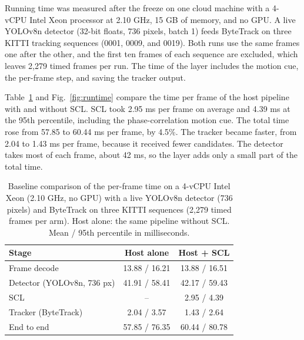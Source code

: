 \documentclass[pdflatex,sn-mathphys-num,iicol]{sn-jnl}
\makeatletter
\def\subsectionfont{\reset@font\fontfamily{\rmdefault}\fontsize{10bp}{12bp}\bfseries\selectfont\raggedright\boldmath}
\renewcommand\subsection{\@startsection{subsection}{2}{\z@}{-7pt \@plus -2pt \@minus -2pt}{3pt}{\subsectionfont}}
\newcommand{\scl}{SCL}
\makeatother
\begin{document}
\subsection{Running time}\label{sec:latency}
\label{sec:latency-setup}Running time was measured after the freeze on one cloud machine with a 4-vCPU
Intel Xeon processor at 2.10 GHz, 15 GB of memory, and no GPU. A live YOLOv8n
detector (32-bit floats, 736 pixels, batch 1) feeds ByteTrack on three KITTI
tracking sequences (0001, 0009, and 0019). Both runs use the same frames
one after the other, and the first ten frames of each sequence are excluded,
which leaves 2,279 timed frames per run. The time of the layer includes the
motion cue, the per-frame step, and saving the tracker output.

Table~\ref{tab:runtime} and Fig.~\ref{fig:runtime} compare the time per frame
of the host pipeline with and without \scl{}. \scl{} took 2.95 ms per
frame on average and 4.39 ms at the 95th percentile, including the
phase-correlation motion cue. The total time rose from 57.85 to 60.44 ms
per frame, by 4.5\%. The tracker became faster, from 2.04 to 1.43 ms per
frame, because it received fewer candidates. The detector takes most of each
frame, about 42 ms, so the layer adds only a small part of the total time.

\begin{table}[t]
\caption{Baseline comparison of the per-frame time on a 4-vCPU Intel Xeon
(2.10 GHz, no GPU) with a live YOLOv8n detector (736 pixels) and ByteTrack on
three KITTI sequences (2,279 timed frames per arm). Host alone: the same
pipeline without \scl{}. Mean / 95th percentile in milliseconds.}
\label{tab:runtime}
\centering\footnotesize
\setlength{\tabcolsep}{4pt}
\begin{tabular}{@{}lcc@{}}
\toprule
Stage & Host alone & Host + \scl{}\\
\midrule
Frame decode & 13.88 / 16.21 & 13.88 / 16.51\\
Detector (YOLOv8n, 736 px) & 41.91 / 58.41 & 42.17 / 59.43\\
\scl{} & -- & 2.95 / 4.39\\
Tracker (ByteTrack) & 2.04 / 3.57 & 1.43 / 2.64\\
End to end & 57.85 / 76.35 & 60.44 / 80.78\\
\bottomrule
\end{tabular}
\end{table}
\end{document}
